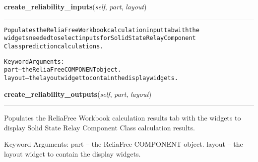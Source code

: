     \label{reliafree:relays:relay:SolidState:create_reliability_inputs}

    \vspace{0.5ex}

\hspace{.8\funcindent}\begin{boxedminipage}{\funcwidth}

    \raggedright \textbf{create\_reliability\_inputs}(\textit{self}, \textit{part}, \textit{layout})

    \vspace{-1.5ex}

    \rule{\textwidth}{0.5\fboxrule}
\setlength{\parskip}{2ex}
\begin{alltt}
Populates the ReliaFree Workbook calculation input tab with the
widgets needed to select inputs for Solid State Relay Component
Class prediction calculations.

Keyword Arguments:
  part -- the ReliaFree COMPONENT object.
layout -- the layout widget to contain the display widgets.
\end{alltt}

\setlength{\parskip}{1ex}
    \end{boxedminipage}

    \label{reliafree:relays:relay:SolidState:create_reliability_outputs}

    \vspace{0.5ex}

\hspace{.8\funcindent}\begin{boxedminipage}{\funcwidth}

    \raggedright \textbf{create\_reliability\_outputs}(\textit{self}, \textit{part}, \textit{layout})

    \vspace{-1.5ex}

    \rule{\textwidth}{0.5\fboxrule}
\setlength{\parskip}{2ex}
    Populates the ReliaFree Workbook calculation results tab with the 
    widgets to display Solid State Relay Component Class calculation 
    results.

    Keyword Arguments: part   -- the ReliaFree COMPONENT object. layout -- 
    the layout widget to contain the display widgets.

\setlength{\parskip}{1ex}
    \end{boxedminipage}

